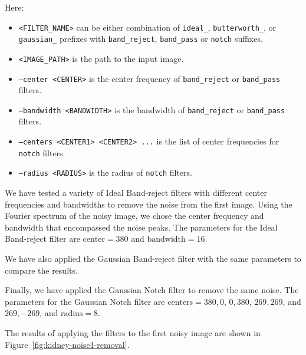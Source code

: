 \documentclass[a4paper,12pt]{article}
\begin{document}
Here:

\begin{itemize}
    \item \texttt{<FILTER\_NAME>} can be either combination of \texttt{ideal\_}, \texttt{butterworth\_}, or \texttt{gaussian\_} prefixes with \texttt{band\_reject}, \texttt{band\_pass} or \texttt{notch} suffixes.
    \item \texttt{<IMAGE\_PATH>} is the path to the input image.
    \item \texttt{--center <CENTER>} is the center frequency of \texttt{band\_reject} or \texttt{band\_pass} filters.
    \item \texttt{--bandwidth <BANDWIDTH>} is the bandwidth of \texttt{band\_reject} or \texttt{band\_pass} filters.
    \item \texttt{--centers <CENTER1> <CENTER2> ...} is the list of center frequencies for \texttt{notch} filters.
    \item \texttt{--radius <RADIUS>} is the radius of \texttt{notch} filters.
\end{itemize}

We have tested a variety of Ideal Band-reject filters with different center frequencies and bandwidths to remove the noise from the first image. Using the Fourier spectrum of the noisy image, we chose the center frequency and bandwidth that encompassed the noise peaks. The parameters for the Ideal Band-reject filter are \( \text{center} = 380 \) and \( \text{bandwidth} = 16 \).

We have also applied the Gaussian Band-reject filter with the same parameters to compare the results.

Finally, we have applied the Gaussian Notch filter to remove the same noise. The parameters for the Gaussian Notch filter are \( \text{centers} = 380, 0 \), \( 0, 380 \), \( 269, 269 \), and \( 269, -269 \), and \( \text{radius} = 8 \).

The results of applying the filters to the first noisy image are shown in Figure~\ref{fig:kidney-noise1-removal}.
\end{document}
